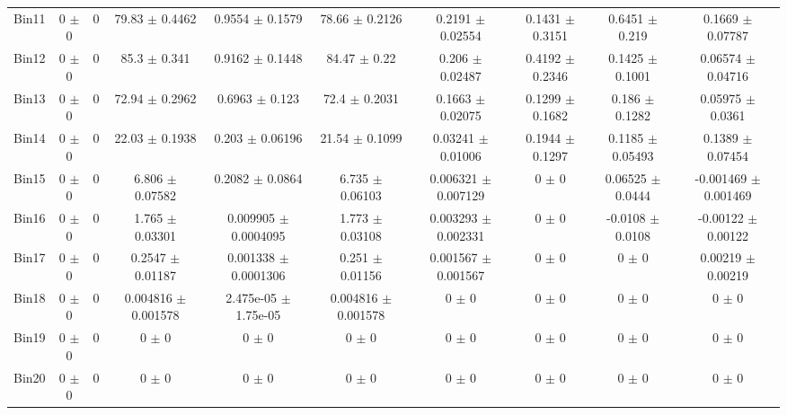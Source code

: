 \begin{tabular}{@{\extracolsep{4pt}}lccccccccc@{}}
     Bin11 & 0 $\pm$ 0 & 0 & 79.83 $\pm$ 0.4462 & 0.9554 $\pm$ 0.1579 & 78.66 $\pm$ 0.2126 & 0.2191 $\pm$ 0.02554 & 0.1431 $\pm$ 0.3151 & 0.6451 $\pm$ 0.219 & 0.1669 $\pm$ 0.07787 \\ 
     Bin12 & 0 $\pm$ 0 & 0 & 85.3 $\pm$ 0.341 & 0.9162 $\pm$ 0.1448 & 84.47 $\pm$ 0.22 & 0.206 $\pm$ 0.02487 & 0.4192 $\pm$ 0.2346 & 0.1425 $\pm$ 0.1001 & 0.06574 $\pm$ 0.04716 \\ 
     Bin13 & 0 $\pm$ 0 & 0 & 72.94 $\pm$ 0.2962 & 0.6963 $\pm$ 0.123 & 72.4 $\pm$ 0.2031 & 0.1663 $\pm$ 0.02075 & 0.1299 $\pm$ 0.1682 & 0.186 $\pm$ 0.1282 & 0.05975 $\pm$ 0.0361 \\ 
     Bin14 & 0 $\pm$ 0 & 0 & 22.03 $\pm$ 0.1938 & 0.203 $\pm$ 0.06196 & 21.54 $\pm$ 0.1099 & 0.03241 $\pm$ 0.01006 & 0.1944 $\pm$ 0.1297 & 0.1185 $\pm$ 0.05493 & 0.1389 $\pm$ 0.07454 \\ 
     Bin15 & 0 $\pm$ 0 & 0 & 6.806 $\pm$ 0.07582 & 0.2082 $\pm$ 0.0864 & 6.735 $\pm$ 0.06103 & 0.006321 $\pm$ 0.007129 & 0 $\pm$ 0 & 0.06525 $\pm$ 0.0444 & -0.001469 $\pm$ 0.001469 \\ 
     Bin16 & 0 $\pm$ 0 & 0 & 1.765 $\pm$ 0.03301 & 0.009905 $\pm$ 0.0004095 & 1.773 $\pm$ 0.03108 & 0.003293 $\pm$ 0.002331 & 0 $\pm$ 0 & -0.0108 $\pm$ 0.0108 & -0.00122 $\pm$ 0.00122 \\ 
     Bin17 & 0 $\pm$ 0 & 0 & 0.2547 $\pm$ 0.01187 & 0.001338 $\pm$ 0.0001306 & 0.251 $\pm$ 0.01156 & 0.001567 $\pm$ 0.001567 & 0 $\pm$ 0 & 0 $\pm$ 0 & 0.00219 $\pm$ 0.00219 \\ 
     Bin18 & 0 $\pm$ 0 & 0 & 0.004816 $\pm$ 0.001578 & 2.475e-05 $\pm$ 1.75e-05 & 0.004816 $\pm$ 0.001578 & 0 $\pm$ 0 & 0 $\pm$ 0 & 0 $\pm$ 0 & 0 $\pm$ 0 \\ 
     Bin19 & 0 $\pm$ 0 & 0 & 0 $\pm$ 0 & 0 $\pm$ 0 & 0 $\pm$ 0 & 0 $\pm$ 0 & 0 $\pm$ 0 & 0 $\pm$ 0 & 0 $\pm$ 0 \\ 
     Bin20 & 0 $\pm$ 0 & 0 & 0 $\pm$ 0 & 0 $\pm$ 0 & 0 $\pm$ 0 & 0 $\pm$ 0 & 0 $\pm$ 0 & 0 $\pm$ 0 & 0 $\pm$ 0 \\ 
\hline\hline
  \end{tabular}
